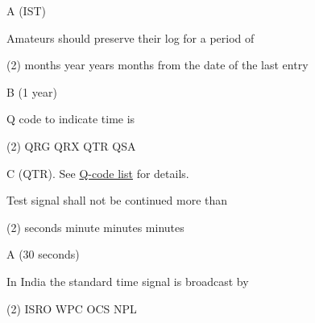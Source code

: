 \documentclass[a4paper]{article}
\begin{document}
\begin{solution}
	A (IST)
\end{solution}

\vspace{5mm}



\begin{question}Amateurs should preserve their log for a period of
	\begin{tasks}(2)
		 months
		 year
		 years
		 months from the date of the last entry
	\end{tasks}
\end{question}

\begin{solution}
	B (1 year)
\end{solution}

\vspace{5mm}



\begin{question}Q code to indicate time is
	\begin{tasks}(2)
		\task QRG
		\task QRX
		\task QTR
		\task QSA
	\end{tasks}
\end{question}

\begin{solution}
	C (QTR). See \href{http://www.giangrandi.ch/electronics/radio/qcode.shtml}{Q-code list} for details.
\end{solution}

\vspace{5mm}



\begin{question}Test signal shall not be continued more than
	\begin{tasks}(2)
		 seconds
		 minute
		 minutes
		 minutes
	\end{tasks}
\end{question}

\begin{solution}
	A (30 seconds)
\end{solution}

\vspace{5mm}



\begin{question}In India the standard time signal is broadcast by
	\begin{tasks}(2)
		\task ISRO
		\task WPC
		\task OCS
		\task NPL
	\end{tasks}
\end{question}
\end{document}
